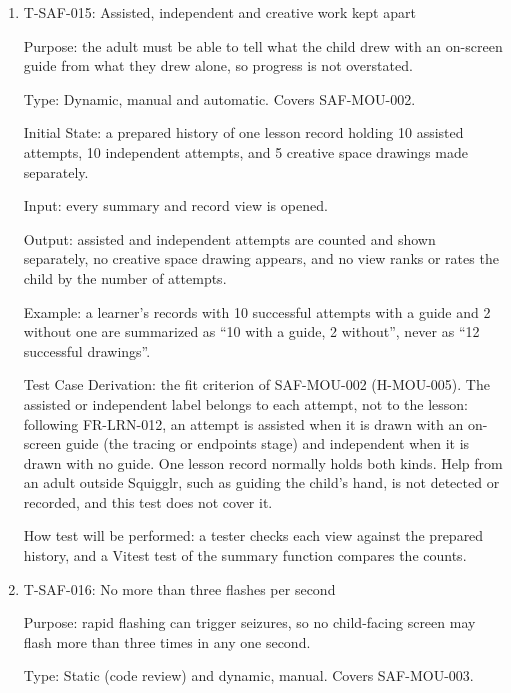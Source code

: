 \documentclass[12pt, titlepage]{article}
\newcommand{\testitem}[1]{\item #1\par\nopagebreak}
\begin{document}
\begin{enumerate}
Output: the feedback shows where the side is missing, and the strokes on
screen and in the record are the same before and after the feedback.

Test Case Derivation: the fit criterion of SAF-MOU-001 (H-MOU-004).

How test will be performed: Playwright compares the stroke data before and
after the feedback is shown.

\testitem{T-SAF-015: Assisted, independent and creative work kept apart}

Purpose: the adult must be able to tell what the child drew with an
on-screen guide from what they drew alone, so progress is not overstated.

Type: Dynamic, manual and automatic. Covers SAF-MOU-002.

Initial State: a prepared history of one lesson record holding 10 assisted
attempts, 10 independent attempts, and 5 creative space drawings made
separately.

Input: every summary and record view is opened.

Output: assisted and independent attempts are counted and shown separately,
no creative space drawing appears, and no view ranks or rates the child by
the number of attempts.

Example: a learner's records with 10 successful attempts with a guide and 2
without one are summarized as ``10 with a guide, 2 without'', never as
``12 successful drawings''.

Test Case Derivation: the fit criterion of SAF-MOU-002 (H-MOU-005). The
assisted or independent label belongs to each attempt, not to the lesson:
following FR-LRN-012, an attempt is assisted when it is drawn with an
on-screen guide (the tracing or endpoints stage) and independent when it is
drawn with no guide. One lesson record normally holds both kinds. Help from
an adult outside Squigglr, such as guiding the child's hand, is not detected
or recorded, and this test does not cover it.

How test will be performed: a tester checks each view against the prepared
history, and a Vitest test of the summary function compares the counts.

\testitem{T-SAF-016: No more than three flashes per second}

Purpose: rapid flashing can trigger seizures, so no child-facing screen may
flash more than three times in any one second.

Type: Static (code review) and dynamic, manual. Covers SAF-MOU-003.


\end{enumerate}
\end{document}
